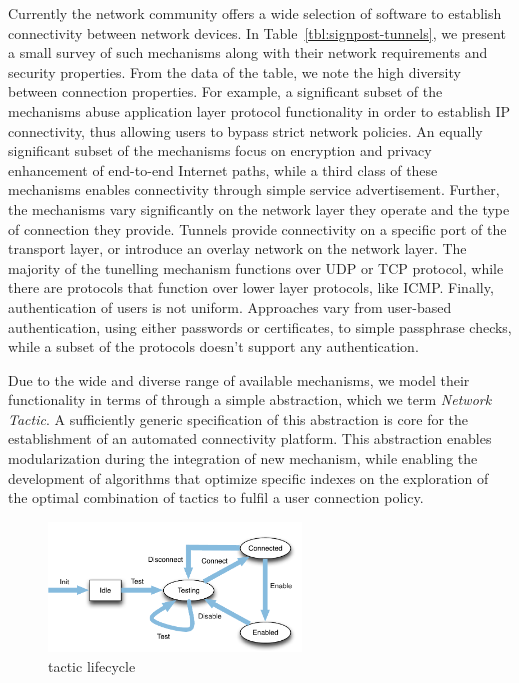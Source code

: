 Currently the network community offers a wide selection of software to establish
connectivity between network devices. In Table~\ref{tbl:signpost-tunnels}, we
present a small survey of such mechanisms along with their network requirements
and security properties.  From the data of the table, we note the high diversity
between connection properties. For example, a significant subset of the
mechanisms abuse application layer protocol functionality in order to establish
IP connectivity, thus allowing users to bypass strict network policies. An equally
significant subset of the mechanisms focus on encryption and privacy enhancement
of end-to-end Internet paths, while a third class of these
mechanisms enables connectivity through simple service advertisement. Further,
the mechanisms vary significantly on the network layer they operate and the type
of connection they provide.  Tunnels provide connectivity on a specific port of
the transport layer, or introduce an overlay network on the network layer.
The majority of the tunelling mechanism functions over UDP or TCP
protocol, while there are protocols that function over lower layer protocols, like
ICMP. Finally, authentication of users is not uniform.  Approaches vary from
user-based authentication, using either passwords or certificates, 
to simple passphrase checks, while a subset of the protocols doesn't
support any authentication. 

Due to the wide and diverse range of available mechanisms, we model their
functionality in terms of \signpost through a simple abstraction, which we term
{\it Network Tactic}. A sufficiently generic specification of this abstraction
is core for the establishment of an automated connectivity platform.
This abstraction enables modularization during the integration of new mechanism,
while enabling the development of algorithms that optimize specific indexes on
the exploration of the optimal combination of tactics to fulfil a user
connection policy.

\begin{figure}
  \begin{center}
	\includegraphics[width=0.6\textwidth]{signpost-tactic}
  \end{center}
  \caption{\signpost tactic lifecycle}
  \label{fig:signpost-tactic}
\end{figure}

